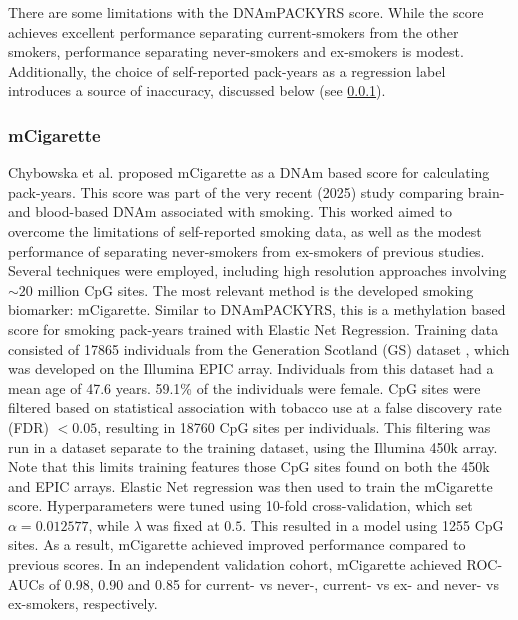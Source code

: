 \documentclass{article} %
\begin{document}
There are some limitations with the DNAmPACKYRS score. While the score achieves excellent performance separating current-smokers from the other smokers, performance separating never-smokers and ex-smokers is modest. Additionally, the choice of self-reported pack-years as a regression label introduces a source of inaccuracy, discussed below (see \ref{sec:mcigarette}).


\subsubsection{mCigarette} \label{sec:mcigarette}
Chybowska et al. \cite{chybowska2025blood} proposed mCigarette as a DNAm based score for calculating pack-years. This score was part of the very recent (2025) study comparing brain- and blood-based DNAm associated with smoking. This worked aimed to overcome the limitations of self-reported smoking data, as well as the modest performance of separating never-smokers from ex-smokers of previous studies. Several techniques were employed, including high resolution approaches involving \(\sim \! 20\) million CpG sites. The most relevant method is the developed smoking biomarker: mCigarette. Similar to DNAmPACKYRS, this is a methylation based score for smoking pack-years trained with Elastic Net Regression. Training data consisted of \num{17865} individuals from the Generation Scotland (GS) dataset \cite{smith2006generation}, which was developed on the Illumina EPIC array. Individuals from this dataset had a mean age of 47.6 years. 59.1\% of the individuals were female. CpG sites were filtered based on statistical association with tobacco use at a false discovery rate (FDR) \(< 0.05\), resulting in \num{18760} CpG sites per individuals. This filtering was run in a dataset separate to the training dataset, using the Illumina 450k array. Note that this limits training features those CpG sites found on both the 450k and EPIC arrays. Elastic Net regression was then used to train the mCigarette score. Hyperparameters were tuned using 10-fold cross-validation, which set \(\alpha = 0.012577\), while \(\lambda\) was fixed at \(0.5\). This resulted in a model using \num{1255} CpG sites. As a result, mCigarette achieved improved performance compared to previous scores. In an independent validation cohort, mCigarette achieved ROC-AUCs of 0.98, 0.90 and 0.85 for current- vs never-, current- vs ex- and never- vs ex-smokers, respectively.
\end{document}
